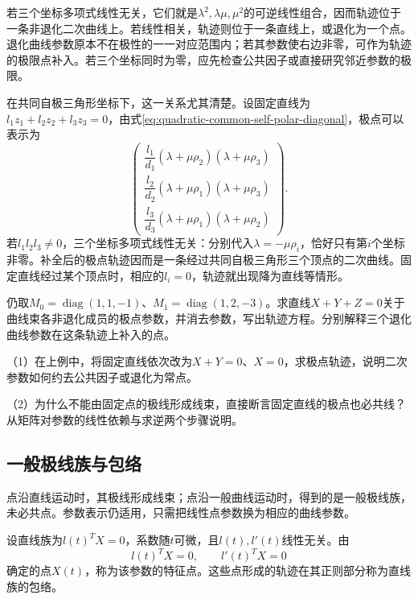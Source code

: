 若三个坐标多项式线性无关，它们就是\(\lambda^2,\lambda\mu,\mu^2\)的可逆线性组合，因而轨迹位于一条非退化二次曲线上。若线性相关，轨迹则位于一条直线上，或退化为一个点。退化曲线参数原本不在极性的一一对应范围内；若其参数使右边非零，可作为轨迹的极限点补入。若三个坐标同时为零，应先检查公共因子或直接研究邻近参数的极限。

在共同自极三角形坐标下，这一关系尤其清楚。设固定直线为\(l_1z_1+l_2z_2+l_3z_3=0\)，由式\eqref{eq:quadratic-common-self-polar-diagonal}，极点可以表示为
\begin{equation*}
 \begin{pmatrix}
 \dfrac{l_1}{d_1}(\lambda+\mu\rho_2)(\lambda+\mu\rho_3)\\[4pt]
 \dfrac{l_2}{d_2}(\lambda+\mu\rho_1)(\lambda+\mu\rho_3)\\[4pt]
 \dfrac{l_3}{d_3}(\lambda+\mu\rho_1)(\lambda+\mu\rho_2)
 \end{pmatrix}.
\end{equation*}
若\(l_1l_2l_3\ne0\)，三个坐标多项式线性无关：分别代入\(\lambda=-\mu\rho_i\)，恰好只有第\(i\)个坐标非零。补全后的极点轨迹因而是一条经过共同自极三角形三个顶点的二次曲线。固定直线经过某个顶点时，相应的\(l_i=0\)，轨迹就出现降为直线等情形。

\begin{example}
仍取\(M_0=\operatorname{diag}(1,1,-1)\)、\(M_1=\operatorname{diag}(1,2,-3)\)。求直线\(X+Y+Z=0\)关于曲线束各非退化成员的极点参数，并消去参数，写出轨迹方程。分别解释三个退化曲线参数在这条轨迹上补入的点。
\end{example}

\begin{exercise}
\mbox{}\par\nobreak

（1）在上例中，将固定直线依次改为\(X+Y=0\)、\(X=0\)，求极点轨迹，说明二次参数如何约去公共因子或退化为常点。

（2）为什么不能由固定点的极线形成线束，直接断言固定直线的极点也必共线？从矩阵对参数的线性依赖与求逆两个步骤说明。
\end{exercise}

\subsection{一般极线族与包络}
\label{subsec:quadratic-general-polar-envelope}

点沿直线运动时，其极线形成线束；点沿一般曲线运动时，得到的是一般极线族，未必共点。参数表示仍适用，只需把线性点参数换为相应的曲线参数。

\begin{definition}
设直线族为\(l(t)^TX=0\)，系数随\(t\)可微，且\(l(t),l'(t)\)线性无关。由
\begin{equation}\label{eq:quadratic-envelope-contact-equations}
 l(t)^TX=0,\qquad l'(t)^TX=0
\end{equation}
确定的点\(X(t)\)，称为该参数的{\heiti{}特征点}。这些点形成的轨迹在其正则部分称为直线族的{\heiti{}包络}。
\end{definition}

